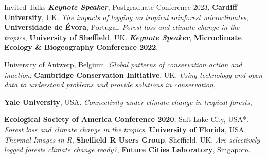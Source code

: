 \begin{rubric}{Invited Talks}
\entry*[2023] \textbf{\emph{Keynote Speaker}}, Postgraduate Conference 2023, \textbf{Cardiff University}, UK.
\entry*[2023] \emph{The impacts of logging on tropical rainforest microclimates}, \textbf{Universidade de Évora}, Portugal.
\entry*[2022] \emph{Forest loss and climate change in the tropics}, \textbf{University of Sheffield}, UK.
\entry*[2022] \textbf{\emph{Keynote Speaker}}, \textbf{Microclimate Ecology \& Biogeography Conference 2022},\par University of Antwerp, Belgium.
\entry*[2022] \emph{Global patterns of conservation action and inaction}, \textbf{Cambridge Conservation Initiative}, UK.
\entry*[2021] \emph{Using technology and open data to understand problems and provide solutions in conservation},\par \textbf{Yale University}, USA.
\entry*[2021] \emph{Connectivity under climate change in tropical forests},\par \textbf{Ecological Society of America Conference 2020}, Salt Lake City, USA*.
\entry*[2019] \emph{Forest loss and climate change in the tropics}, \textbf{University of Florida}, USA.
\entry*[2017] \emph{Thermal Images in R}, \textbf{Sheffield R Users Group}, Sheffield, UK.
\entry*[2016] \emph{Are selectively logged forests climate change ready?}, \textbf{Future Cities Laboratory}, Singapore.
\end{rubric}